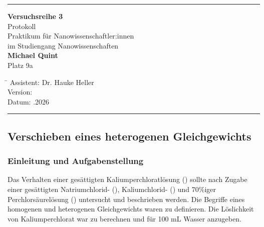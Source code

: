 \documentclass[
	a4paper,										%
	12pt,											%
	twoside,										%
	headsepline,								%
	footsepline,									%
	captions=tableheading,					%
]{scrartcl}
\begin{document}
	
	\begin{titlepage}
		\begin{center}
			\hrule													%
			\vspace*{5cm}
			\Huge {\textbf {Versuchsreihe 3}}\\						%
			\vspace*{0.5cm}
			\vspace*{1cm}
			\normalsize
			Protokoll	\\									
			Praktikum für Nanowissenschaftler:innen\\
			im Studiengang Nanowissenschaften\\
			\vspace*{0.5cm}
			\Large {\textbf{Michael Quint}}		\\						%
			\vspace*{0.5cm}
					\normalsize{Platz 9a}								%
			\vfill
		\end{center}
		\begin{tabbing}
			\hspace{3cm}\=\kill
			Assistent: \> Dr. Hauke Heller \\						%
			Version:  \\									%
			Datum: .2026 \\								%
		\end{tabbing}
		\hrule														%
\end{titlepage}

\setcounter{page}{1}
\setcounter{section}{3}								%
\setcounter{subsection}{0}							%
\setcounter{secnumdepth}{4}
	
\subsection{Verschieben eines heterogenen Gleichgewichts}

\subsubsection{Einleitung und Aufgabenstellung}

	Das Verhalten einer gesättigten Kaliumperchloratlösung () sollte nach Zugabe einer gesättigten Natriumchlorid- (),
	Kaliumchlorid- () und 70\%iger Perchlorsäurelösung () untersucht und beschrieben werden. Die Begriffe eines homogenen und heterogenen Gleichgewichts waren zu definieren.
	Die Löslichkeit von Kaliumperchlorat war zu berechnen und für 100 mL Wasser anzugeben.
\end{document}

